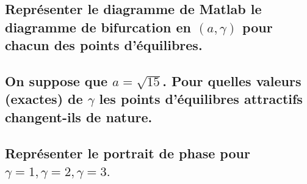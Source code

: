 \documentclass[10pt,a4paper]{article}
\begin{document}
\subsection{Représenter le diagramme de Matlab le diagramme de bifurcation  en $(a,\gamma)$ pour chacun des points d'équilibres.}
\subsection{On suppose que $a=\sqrt{15}$. Pour quelles valeurs (exactes) de $\gamma$ les points d'équilibres attractifs changent-ils de nature.}
\subsection{Représenter le portrait de phase pour $\gamma=1, \gamma=2, \gamma=3.$}
\end{document}
